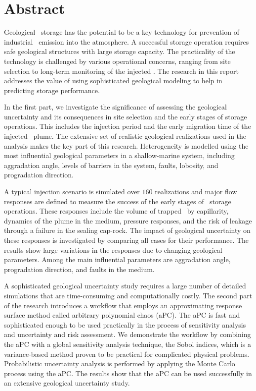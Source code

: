 \chapter{Abstract}
Geological \coo\ storage has the potential to be a key technology for prevention of industrial
\coo\ emission into the atmosphere. A successful storage operation requires safe geological structures with large storage capacity. The practicality of the technology is challenged by various operational concerns, ranging from site selection to long-term monitoring of the injected \coo.
The research in this report addresses the value  of using sophisticated geological modeling to help in predicting storage performance. 

In the first part, we investigate the significance of assessing the geological uncertainty and its consequences in site selection and the early stages of storage operations. This includes the injection period and the early migration time of the injected \coo\ plume. The extensive set of realistic geological realizations used in the analysis makes the key part of this research. Heterogeneity is modelled using the most influential geological parameters in a shallow-marine system, including aggradation angle, levels of barriers in the system, faults, lobosity, and progradation direction.

A typical injection scenario is simulated over $160$ realizations and major flow responses are defined to measure the success of the early stages of \coo\ storage operations. These responses include the volume of trapped \coo\ by capillarity, dynamics of the plume in the medium, pressure responses, and the risk of leakage through a failure in the sealing cap-rock. The impact of geological uncertainty on these responses is investigated by comparing all cases for their performance. The results show large variations in the responses due to changing geological parameters. Among the main influential parameters are aggradation angle, progradation direction, and faults in the medium.

A sophisticated geological uncertainty study requires a large number of detailed simulations that are time-consuming and computationally costly. The second part of the research introduces a workflow that employs an approximating response surface method called arbitrary polynomial chaos (aPC). The aPC is fast and sophisticated enough to be used practically in the process of sensitivity analysis and uncertainty and risk assessment. We demonstrate the workflow by combining the aPC with a global sensitivity analysis technique, the Sobol indices, which is a variance-based
method proven to be practical for complicated physical problems. Probabilistic uncertainty analysis is performed by applying the Monte Carlo process using the aPC. The results show that the aPC can be used successfully in an extensive geological uncertainty study.
